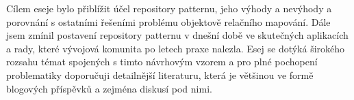 \documentclass[10pt]{article}
\begin{document}
Cílem eseje bylo přiblížit účel repository patternu, jeho výhody a nevýhody a
porovnání s ostatními řešeními problému objektově relačního mapování. Dále jsem
zmínil postavení repository patternu v dnešní době ve skutečných aplikacích a
rady, které vývojová komunita po letech praxe nalezla. Esej se dotýká širokého
rozsahu témat spojených s timto návrhovým vzorem a pro plné pochopení
problematiky doporučuji detailnější literaturu, která je většinou ve formě
blogových příspěvků a zejména diskusí pod nimi.


% 
% 
\end{document}
